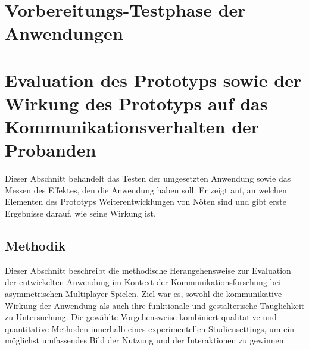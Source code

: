 \chapter{Vorbereitungs-Testphase der Anwendungen}

\chapter{Evaluation des Prototyps sowie der Wirkung des Prototyps auf das Kommunikationsverhalten der Probanden}

Dieser Abschnitt behandelt das Testen der umgesetzten Anwendung sowie das Messen des Effektes, den die Anwendung haben soll. Er zeigt auf, an welchen Elementen des Prototyps Weiterentwicklungen von Nöten sind und gibt erste Ergebnisse darauf, wie seine Wirkung ist.




\section{Methodik}


Dieser Abschnitt beschreibt die methodische Herangehensweise zur Evaluation der entwickelten Anwendung im Kontext der Kommunikationsforschung bei asymmetrischen-Multiplayer Spielen. Ziel war es, sowohl die kommunikative Wirkung der Anwendung als auch ihre funktionale und gestalterische Tauglichkeit zu Untersuchung. Die gewählte Vorgehensweise kombiniert qualitative und quantitative Methoden innerhalb eines experimentellen Studiensettings, um ein möglichst umfassendes Bild der Nutzung und der Interaktionen zu gewinnen.

